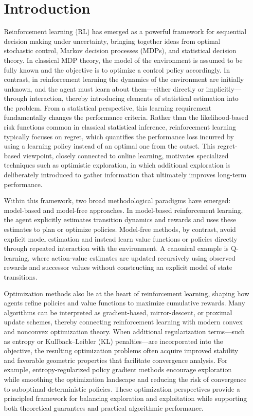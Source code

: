 \documentclass{article}
\numberwithin{equation}{section}
\begin{document}
\section{Introduction}
\label{s1}
Reinforcement learning (RL) has emerged as a powerful framework for sequential decision making under uncertainty, bringing together ideas from optimal stochastic control, Markov decision processes (MDPs), and statistical decision theory. In classical MDP theory, the model of the environment is assumed to be fully known and the objective is to optimize a control policy accordingly. In contrast, in reinforcement learning the dynamics of the environment are initially unknown, and the agent must learn about them—either directly or implicitly—through interaction, thereby introducing elements of statistical estimation into the problem. From a statistical perspective, this learning requirement fundamentally changes the performance criteria. Rather than the likelihood-based risk functions common in classical statistical inference, reinforcement learning typically focuses on regret, which quantifies the performance loss incurred by using a learning policy instead of an optimal one from the outset. This regret-based viewpoint, closely connected to online learning, motivates specialized techniques such as optimistic exploration, in which additional exploration is deliberately introduced to gather information that ultimately improves long-term performance.
\par
Within this framework, two broad methodological paradigms have emerged: model-based and model-free approaches. In model-based reinforcement learning, the agent explicitly estimates transition dynamics and rewards and uses these estimates to plan or optimize policies. Model-free methods, by contrast, avoid explicit model estimation and instead learn value functions or policies directly through repeated interaction with the environment. A canonical example is Q-learning, where action-value estimates are updated recursively using observed rewards and successor values without constructing an explicit model of state transitions.
\par
Optimization methods also lie at the heart of reinforcement learning, shaping how agents refine policies and value functions to maximize cumulative rewards. Many algorithms can be interpreted as gradient-based, mirror-descent, or proximal update schemes, thereby connecting reinforcement learning with modern convex and nonconvex optimization theory. When additional regularization terms—such as entropy or Kullback–Leibler (KL) penalties—are incorporated into the objective, the resulting optimization problems often acquire improved stability and favorable geometric properties that facilitate convergence analysis. For example, entropy-regularized policy gradient methods encourage exploration while smoothing the optimization landscape and reducing the risk of convergence to suboptimal deterministic policies. These optimization perspectives provide a principled framework for balancing exploration and exploitation while supporting both theoretical guarantees and practical algorithmic performance.
\end{document}
